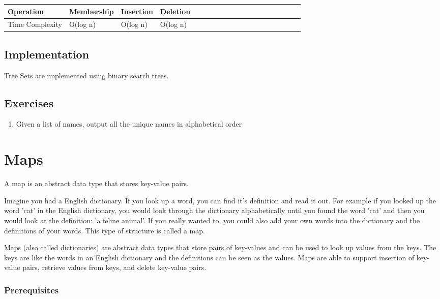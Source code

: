 \documentclass[11pt,oneside]{book}
\begin{document}
\vspace{10pt} \begin{tabular}{|l|l|l|l|l|l|l|l|l|l|l|l|l|l|l|l|l|l|l}\hline


  Operation &
  Membership &
  Insertion &
  Deletion\\
\hline


  Time Complexity &
  O(log n) &
  O(log n) &
  O(log n)\\

\hline\end{tabular}

\subsection{Implementation}

Tree Sets are implemented using binary search trees.

\subsection{Exercises}

\begin{enumerate}
\item Given a list of names, output all the unique names in alphabetical order
\end{enumerate}
\section{Maps}

A map is an abstract data type that stores key-value pairs.

Imagine you had a English dictionary. If you look up a word, you can find it's definition and read it out. For example if you looked up the word 'cat' in the English dictionary, you would look through the dictionary alphabetically until you found the word 'cat' and then you would look at the definition: 'a feline animal'. If you really wanted to, you could also add your own words into the dictionary and the definitions of your words. This type of structure is called a map.

Maps (also called dictionaries) are abstract data types that store pairs of key-values and can be used to look up values from the keys. The keys are like the words in an English dictionary and the definitions can be seen as the values. Maps are able to support insertion of key-value pairs, retrieve values from keys, and delete key-value pairs.

\subsubsection{Prerequisites}
\end{document}

